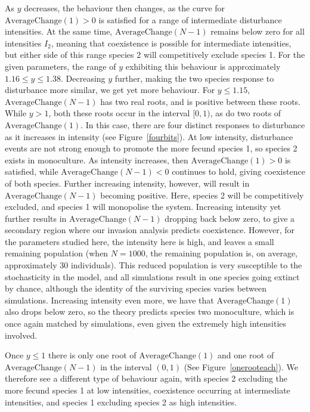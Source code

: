 As $y$ decreases, the behaviour then changes, as the curve for $\text{AverageChange}(1)>0$ is satisfied for a range of intermediate disturbance intensities. At the same time, $\text{AverageChange}(N-1)$ remains below zero for all intensities $I_2$, meaning that coexistence is possible for intermediate intensities, but either side of this range species 2 will competitively exclude species 1. For the given parameters, the range of $y$ exhibiting this behaviour is approximately $1.16 \leq y \leq 1.38$. Decreasing $y$ further, making the two species response to disturbance more similar, we get yet more behaviour. For $y\leq 1.15$, $\text{AverageChange}(N-1)$ has two real roots, and is positive between these roots. While $y>1$, both these roots occur in the interval $[0,1)$, as do two roots of $\text{AverageChange}(1)$. In this case, there are four distinct responses to disturbance as it increases in intensity (see Figure~\ref{fourbits}). At low intensity, disturbance events are not strong enough to promote the more fecund species 1, so species 2 exists in monoculture. As intensity increases, then $\text{AverageChange}(1)>0$ is satisfied, while $\text{AverageChange}(N-1)<0$ continues to hold, giving coexistence of both species. Further increasing intensity, however, will result in $\text{AverageChange}(N-1)$ becoming positive. Here, species 2 will be competitively excluded, and species 1 will monopolise the system. Increasing intensity yet further results in $\text{AverageChange}(N-1)$ dropping back below zero, to give a secondary region where our invasion analysis predicts coexistence. However, for the parameters studied here, the intensity here is high, and leaves a small remaining population (when $N=1000$, the remaining population is, on average, approximately 30 individuals). This reduced population is very susceptible to the stochasticity in the model, and all simulations result in one species going extinct by chance, although the identity of the surviving species varies between simulations. Increasing intensity even more, we have that $\text{AverageChange}(1)$ also drops below zero, so the theory predicts species two monoculture, which is once again matched by simulations, even given the extremely high intensities involved.

Once $y\leq 1$ there is only one root of $\text{AverageChange}(1)$ and one root of $\text{AverageChange}(N-1)$ in the interval $(0,1)$ (See Figure~\ref{onerooteach}). We therefore see a different type of behaviour again, with species 2 excluding the more fecund species 1 at low intensities, coexistence occurring at intermediate intensities, and species 1 excluding species 2 as high intensities.

